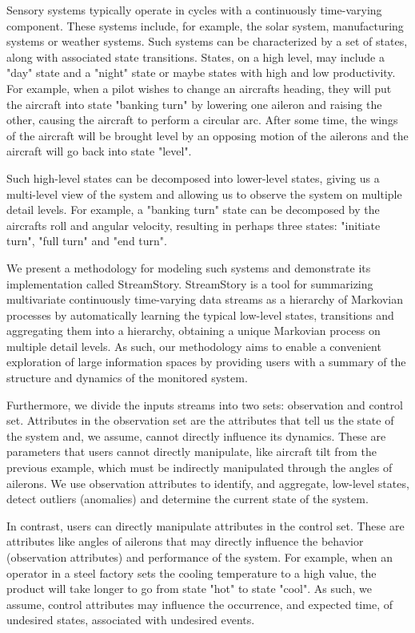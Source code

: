 Sensory systems typically operate in cycles with a continuously time-varying component. These 
systems include, for example, the solar system, manufacturing systems or weather 
systems. Such systems can be characterized by a set of states, along with associated
state transitions. States, on a high level, may include a "day" state and a "night"
state or maybe states with high and low productivity. For example, when a pilot wishes
to change an aircrafts heading, they will put the aircraft into state "banking turn"
by lowering one aileron and raising the other, causing the aircraft to perform a
circular arc. After some time, the wings of the aircraft will be brought level by
an opposing motion of the ailerons and the aircraft will go back into state "level".

Such high-level states can be decomposed into lower-level states, giving us a 
multi-level view of the system and allowing us to observe the system on multiple 
detail levels. For example, a "banking turn" state can be decomposed by the
aircrafts roll and angular velocity, resulting in perhaps three states: "initiate
turn", "full turn" and "end turn".

We present a methodology for modeling such systems and demonstrate its implementation
called StreamStory. StreamStory is a tool for summarizing multivariate continuously
time-varying data streams as a hierarchy of Markovian processes by automatically learning
the typical low-level states, transitions and aggregating them into a hierarchy, obtaining
a unique Markovian process on multiple detail levels. As such, our methodology aims to enable
a convenient exploration of large information spaces by providing users with a 
summary of the structure and dynamics of the monitored system.

Furthermore, we divide the inputs streams into two sets: observation and control set.
Attributes in the observation set are the attributes that tell us the state of the 
system and, we assume, cannot directly influence its dynamics. These are parameters
that users cannot directly manipulate, like aircraft tilt from the previous example,
which must be indirectly manipulated through the angles of ailerons. We use observation
attributes to identify, and aggregate, low-level states, detect outliers (anomalies) 
and determine the current state of the system.

In contrast, users can directly manipulate attributes in the control set. These 
are attributes like angles of ailerons that may directly influence the behavior 
(observation attributes) and performance of the system. For example, when an operator 
in a steel factory sets the cooling temperature to a high value, the product will
take longer to go from state "hot" to state "cool". As such, we assume, control attributes
may influence the occurrence, and expected time, of undesired states, associated with
undesired events.

